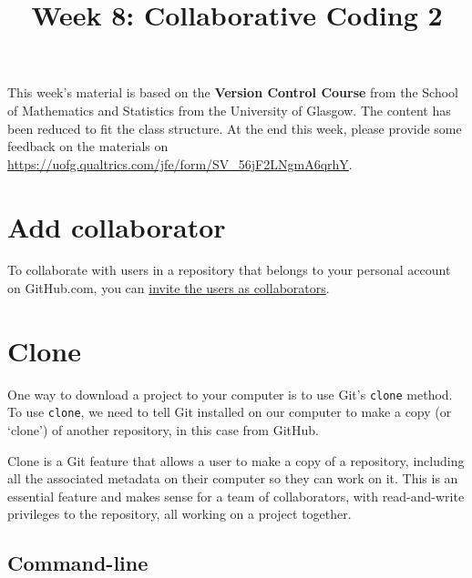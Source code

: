 \documentclass[
  letterpaper,
  DIV=11,
  numbers=noendperiod]{scrartcl}
\title{Week 8: Collaborative Coding 2}
\author{}
\date{}
\begin{document}
\maketitle
\ifdefined\Shaded\renewenvironment{Shaded}{\begin{tcolorbox}[sharp corners, breakable, frame hidden, borderline west={3pt}{0pt}{shadecolor}, interior hidden, enhanced, boxrule=0pt]}{\end{tcolorbox}}\fi

This week's material is based on the \textbf{Version Control Course}
from the School of Mathematics and Statistics from the University of
Glasgow. The content has been reduced to fit the class structure. At the
end this week, please provide some feedback on the materials on
\url{https://uofg.qualtrics.com/jfe/form/SV_56jF2LNgmA6qrhY}.

\hypertarget{add-collaborator}{%
\section{Add collaborator}\label{add-collaborator}}

To collaborate with users in a repository that belongs to your personal
account on GitHub.com, you can
\href{https://docs.github.com/en/account-and-profile/setting-up-and-managing-your-personal-account-on-github/managing-access-to-your-personal-repositories/inviting-collaborators-to-a-personal-repository}{invite
the users as collaborators}.

\hypertarget{clone}{%
\section{Clone}\label{clone}}

One way to download a project to your computer is to use Git's
\texttt{clone} method. To use \texttt{clone}, we need to tell Git
installed on our computer to make a copy (or `clone') of another
repository, in this case from GitHub.

Clone is a Git feature that allows a user to make a copy of a
repository, including all the associated metadata on their computer so
they can work on it. This is an essential feature and makes sense for a
team of collaborators, with read-and-write privileges to the repository,
all working on a project together.

\subsection{Command-line}
\end{document}
